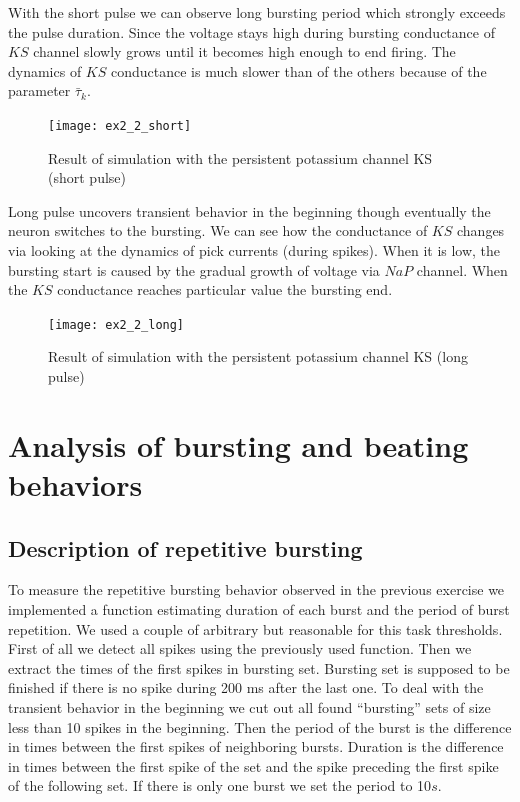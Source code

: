 \documentclass[a4paper,11pt]{article} %
\begin{document}
With the short pulse we can observe long bursting period
which strongly exceeds the pulse duration. Since the voltage stays high during bursting
conductance of $KS$ channel slowly grows until it becomes high enough to end firing.
The dynamics of $KS$ conductance is much slower than of the others because of the parameter $\bar{\tau}_k$.

\begin{figure}[H]
    \centering
    \texttt{[image: ex2\_2\_short]}
    \caption{Result of simulation with the persistent potassium channel KS (short pulse)}
    \label{fig:short}
\end{figure}

Long pulse uncovers transient behavior in the beginning though eventually the neuron
switches to the bursting. We can see how the conductance of $KS$ changes via looking
at the dynamics of pick currents (during spikes). When it is low, the bursting start
is caused by the gradual growth of voltage via $NaP$ channel. When the $KS$ conductance
reaches particular value the bursting end.

\begin{figure}[H]
    \centering
    \texttt{[image: ex2\_2\_long]}
    \caption{Result of simulation with the persistent potassium channel KS (long pulse)}
    \label{fig:long}
\end{figure}

\section{Analysis of bursting and beating behaviors}
\subsection{Description of repetitive bursting}

To measure the repetitive bursting behavior observed in the previous exercise
we implemented a function estimating duration of each burst and the period of
burst repetition. We used a couple of arbitrary but reasonable for this task thresholds.
First of all we detect all spikes using the previously used function. Then we 
extract the times of the first spikes in bursting set.
Bursting set is supposed to be finished if there is no spike during 200 ms after the last one.
To deal with the transient behavior in the beginning we cut out all found ``bursting'' sets of size
less than 10 spikes in the beginning. Then the period of the burst is the difference in times
between the first spikes of neighboring bursts. Duration is the difference in times between the
first spike of the set and the spike preceding the first spike of the following set.
If there is only one burst we set the period to 10$s$.
\end{document}
